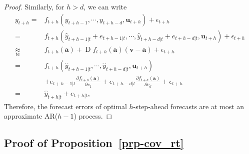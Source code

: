 \documentclass[
  11pt,
  a4paper,
]{article}
\theoremstyle{plain}
\theoremstyle{remark}
\begin{document}
\begin{proof}
Similarly, for \(h > d\), we can write \[
\begin{aligned}
y_{t+h}
=&f_{t+h}\left(y_{t+h-1},\cdots,y_{t+h-d},\bm{u}_{t+h}\right)+\epsilon_{t+h} \\
=&f_{t+h}\left(\hat{y}_{t+h-1|t}+e_{t+h-1|t},\cdots,\hat{y}_{t+h-d|t}+e_{t+h-d|t},\bm{u}_{t+h}\right)+\epsilon_{t+h} \\
\underset{\text{te}}{\approx}&f_{t+h}\left(\bm{a}\right)+\operatorname{D}f_{t+h}\left(\bm{a}\right)\left(\bm{v}-\bm{a}\right)+
\epsilon_{t+h} \\
=&f_{t+h}\left(\hat{y}_{t+h-1|t},\cdots,\hat{y}_{t+h-d|t},\bm{u}_{t+h}\right) \\
&+e_{t+h-1|t}\frac{\partial f_{t+h}\left(\bm{a}\right)}{\partial v_1}+e_{t+h-d|t}\frac{\partial f_{t+h}\left(\bm{a}\right)}{\partial v_{d}}+\epsilon_{t+h} \\
=&\hat{y}_{t+h|t}+e_{t+h|t},
\end{aligned}
\] Therefore, the forecast errors of optimal \(h\)-step-ahead forecasts
are at most an approximate AR(\(h-1\)) process.
\end{proof}

\subsection{\texorpdfstring{Proof of
Proposition~\ref{prp-cov_rt}}{Proof of Proposition~}}\label{sec-proof_cov_rt}
\end{document}
